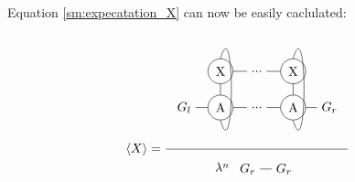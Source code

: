 Equation \cref{sm:expecatation_X} can now be easily caclulated:

\begin{equation}
    \Braket{X} = \frac{
        \begin{tikzpicture} [   ]
        	\clip (-0.5,-1) rectangle (4.5,2);
        
        
        	\node[] (N1) at (0,0) {$G_l$};
        	\node[circle, draw] (N2) at (1,0) {A};
        	\node[circle, draw] (X2) at (1,1) {X};
        
        	\node[] (N3) at (2 ,0) {...};
        	\node[] (X3) at (2,1) {...};
        
        	\node[circle, draw] (N4) at (3 ,0) {A};
        	\node[circle, draw] (X4) at (3,1) {X};
        
        	\node[] (N5) at (4 ,0) {$G_r$};

        
        	\draw  (N1) -- (N2) ;
        	\draw  (N2) -- (N3) ;
        	\draw  (N3) -- (N4) ;
        	\draw  (N4) -- (N5) ;

        
   
        	\draw  (X2) -- (X3) ;
        	\draw  (X3) -- (X4) ;
        
        	\draw  (N2) -- (X2) ;
        	\draw  (N4) -- (X4) ;
        
        	\draw (X2.north)   .. controls +(0.4,1.4) and +(0.4,-1.4) .. (N2.south);
        	\draw (X4.north)   .. controls +(0.4,1.4) and +(0.4,-1.4) .. (N4.south);
        
    \end{tikzpicture}
    }{
        \lambda^n 
         \begin{tikzpicture}[baseline={0cm-0.5*height("$=$")} ] 
    	    \clip (-0.5,-0.5) rectangle (1.4,0.5);
            \node[] (N2) at (1,0) {$G_r$};
        	\node[] (N1) at (0,0) {$G_r$};
        	\draw  (N1) -- (N2) ;
    	\end{tikzpicture}
    }
    \label{sm:expecatation_X_2}
\end{equation}
